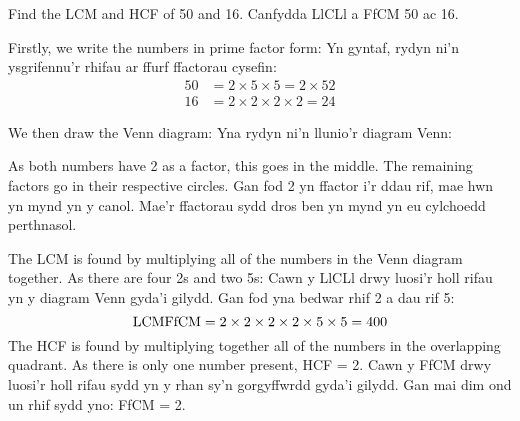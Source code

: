 \begin{example}
\en Find the LCM and HCF of 50 and 16.
\cy Canfydda LlCLl a FfCM 50 ac 16.

\begin{solution}
\en Firstly, we write the numbers in prime factor form:
\cy Yn gyntaf, rydyn ni'n ysgrifennu'r rhifau ar ffurf ffactorau cysefin:
\bi
\begin{align*}
50	& = 2 \times 5 \times 5 = 2 \times 52 \\
16 	& = 2 \times 2 \times 2 \times 2 = 24
\end{align*}

\en We then draw the Venn diagram:
\cy Yna rydyn ni'n llunio'r diagram Venn:

\begin{figure}[H]
\centering
{}
\end{figure}

\en 
As both numbers have 2 as a factor, this goes in the middle. The remaining factors go in their respective circles.
\cy
Gan fod 2 yn ffactor i'r ddau rif, mae hwn yn mynd yn y canol. Mae'r ffactorau sydd dros ben yn mynd yn eu cylchoedd perthnasol.

\en
The LCM is found by multiplying all of the numbers in the Venn diagram together. As there are four 2s and two 5s:
\cy
Cawn y LlCLl drwy luosi'r holl rifau yn y diagram Venn gyda'i gilydd. Gan fod yna bedwar rhif 2 a dau rif 5:
\bi
\[
\text{{LCM}{FfCM}}= 2 \times 2 \times 2 \times 2 \times 5 \times 5 = 400
\]
\en
The HCF is found by multiplying together all of the numbers in the overlapping quadrant. As there is only one number present, HCF = 2.
\cy
Cawn y FfCM drwy luosi'r holl rifau sydd yn y rhan sy'n gorgyffwrdd gyda'i gilydd. Gan mai dim ond un rhif sydd yno: FfCM = 2.

\end{solution}
\end{example}

